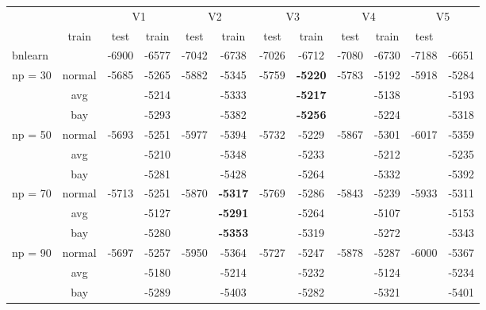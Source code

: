 \documentclass[]{scrartcl}
\begin{document}
\begin{scriptsize}
\begin{center}
\begin{tabular}{cc|cc|cc|cc|cc|cc}
 & & \multicolumn{2}{c}{V1} & \multicolumn{2}{c}{V2} & \multicolumn{2}{c}{V3} & \multicolumn{2}{c}{V4} & \multicolumn{2}{c}{V5} \\
  & train & test & train & test  & train & test  & train & test  & train & test  \\
  \multicolumn{2}{l|}{bnlearn} & -6900 & -6577 & -7042 & -6738  & -7026  & -6712  & -7080  & -6730  & -7188  & -6651  \\\hline\hline
       \multirow{3}{*}{np = 30} & normal & -5685  & -5265  & -5882  & -5345  & -5759  & \textbf{-5220 } & -5783  & -5192  & -5918  & -5284  \\
                                                    & avg        & & -5214  & & -5333  & & \textbf{-5217  }& & -5138  & & -5193 \\
                                                    & bay        & & -5293  & & -5382  & & \textbf{-5256 } & & -5224  & & -5318  \\\cline{1-12}
    \multirow{3}{*}{np = 50} & normal & -5693  & -5251  & -5977  &-5394  & -5732 & -5229  & -5867  & -5301  & -6017  & -5359 \\
    												& avg        & & -5210  & & -5348  & & -5233  & & -5212  & & -5235 \\
                                                     & bay        & & -5281  & & -5428  & & -5264  & & -5332  & & -5392 \\\cline{1-12}
  \multirow{3}{*}{np = 70} & normal & -5713  & -5251  & -5870  & \textbf{-5317  }& -5769  & -5286  & -5843  & -5239  & -5933  & -5311 \\
    												   & avg        & & -5127  & & \textbf{-5291 } & & -5264  & & -5107  & & -5153 \\
                                                       & bay        & & -5280  & & \textbf{-5353 } & & -5319  & &  -5272  & & -5343 \\\cline{1-12}
 \multirow{3}{*}{np = 90} & normal & -5697  & -5257  & -5950  & -5364  & -5727  & -5247  & -5878  & -5287  & -6000  & -5367  \\
    												    & avg        & & -5180  & & -5214 & & -5232  & & -5124  & & -5234 \\
                                                        & bay        & & -5289  & & -5403 & & -5282  & & -5321  & & -5401 \\                                                                                                                
\end{tabular}
\end{center}
\end{scriptsize}
\end{document}
